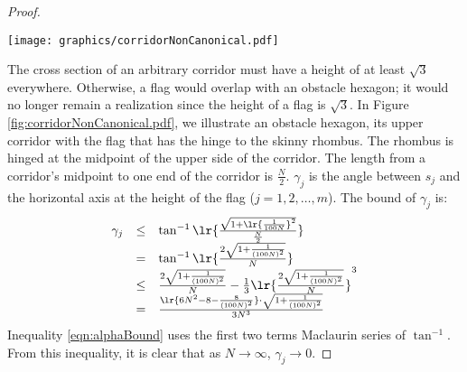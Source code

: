 \begin{proof}
\begin{minipage}{\linewidth}
\begin{center}
\texttt{[image: graphics/corridorNonCanonical.pdf]}
\label{fig:corridorNonCanonical.pdf}
\end{center}
\end{minipage}

The cross section of an arbitrary corridor must have a height of at least $\sqrt{3}$ everywhere. 
Otherwise, a flag would overlap with an obstacle hexagon; it would no longer remain a realization since the height of a flag is $\sqrt{3}$.
In Figure \ref{fig:corridorNonCanonical.pdf}, we illustrate an obstacle hexagon, its upper corridor with the flag that has the hinge to the skinny rhombus.  
The rhombus is hinged at the midpoint of the upper side of the corridor.
The length from a corridor's midpoint to one end of the corridor is $\frac{N}{2}$.
$\gamma_j$ is the angle between $s_j$ and the horizontal axis at the height of the flag ($j = 1,2,\ldots, m$).
The bound of $\gamma_j$ is:
\begin{equation}\label{eqn:alphaBound}
\begin{array}{rcl}
\gamma_j &\leq & \tan^{-1} \lr{
								\frac{
										\sqrt{1+ \lr{	\frac{1}{100N}	}^2}
								}{
										\frac{N}{2}
								}	
							}\\
&=& \tan^{-1} \lr{\frac{2\sqrt{1 + \frac{1}{(100N)^2}}}{N}}\\
&\leq& \frac{2\sqrt{1 + \frac{1}{(100N)^2}}}{N} - \frac{1}{3}\lr{\frac{2\sqrt{1 + \frac{1}{(100N)^2}}}{N}}^3\\
&=&\frac{\lr{6N^2 - 8 - \frac{8}{(100N)^2}}\cdot \sqrt{1 + \frac{1}{(100N)^2}} }{3N^3}
\end{array} 
\end{equation}
Inequality \ref{eqn:alphaBound} uses the first two terms Maclaurin series of $\tan^{-1}$.
From this inequality, it is clear that as $N \rightarrow \infty$, $\gamma_j \rightarrow 0$.





\end{proof}
